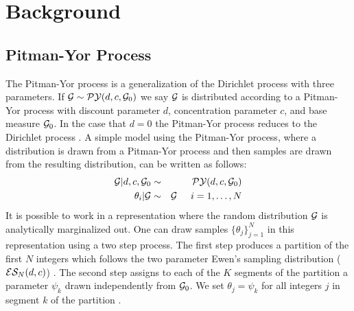 
\section{Background}
\label{basicModel}

\subsection{Pitman-Yor Process}

The Pitman-Yor process is a generalization of the Dirichlet process with three parameters.   If $\G \sim \PY(d,c,\G_0)$ we say $\G$ is distributed according to a Pitman-Yor process with discount parameter $d$, concentration parameter $c$, and base measure $\G_0$. In the case that $d = 0$ the Pitman-Yor process reduces to the Dirichlet process \cite{Pitman1997}.  A simple model using the Pitman-Yor process, where a distribution is drawn from a Pitman-Yor process and then samples are drawn from the resulting distribution, can be written as follows:
%
\begin{eqnarray*}
\G | d,c,\G_0 &\sim& \PY(d,c,\G_0)\\
\theta_i | \G &\sim& \G  \hspace{.5cm} i = 1, \dots, N
\end{eqnarray*}
%
It is possible to work in a representation where the random distribution $\G$ is analytically marginalized out.  One can draw samples $\{ \theta_j \}_{j = 1}^N$ in this representation using a two step process.  The first step produces a partition of the first $N$ integers which follows the two parameter Ewen's sampling distribution ($\ES_N(d,c)$) \cite{Ewens1995}.  The second step assigns to each of the $K$ segments of the partition a parameter $\psi_k$ drawn independently from $\G_0$.  We set $\theta_j = \psi_k$ for all integers $j$ in segment $k$ of the partition \cite{Blackwell1973}.

